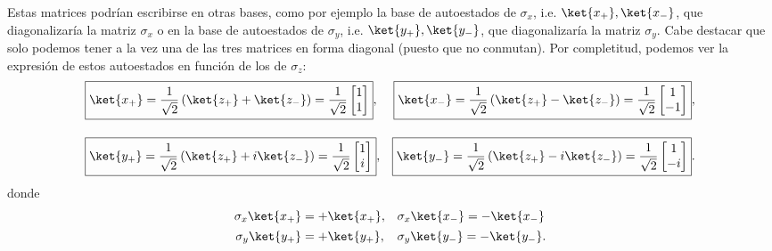 \documentclass[a4paper,11pt]{book} %
\numberwithin{equation}{chapter}
\def\lp{\left(}
\def\rp{\right)}
\begin{document}
Estas matrices podrían escribirse en otras bases, como por ejemplo la base de autoestados de $\sigma_x$, i.e. $\ket{x_+}, \ket{x_-}$, que diagonalizaría la matriz $\sigma_x$ o en la base de autoestados de $\sigma_y$, i.e. $\ket{y_+}, \ket{y_-}$, que diagonalizaría la matriz $\sigma_y$. Cabe destacar que solo podemos tener a la vez una de las tres matrices en forma diagonal (puesto que no conmutan). Por completitud, podemos ver la expresión de estos autoestados en función de los de $ \sigma_z$:
\begin{align}
& \boxed{\ket{x_+}  = \frac{1}{\sqrt{2}} \lp \ket{z_+} + \ket{z_-} \rp = \frac{1}{\sqrt{2}} \begin{bmatrix}  1 \\ 1  \end{bmatrix}},
& \boxed{\ket{x_-}  = \frac{1}{\sqrt{2}} \lp \ket{z_+} - \ket{z_-} \rp = \frac{1}{\sqrt{2}} \begin{bmatrix}  1 \\ -1  \end{bmatrix}},   \\ \rule{0mm}{10mm}
& \boxed{\ket{y_+}  = \frac{1}{\sqrt{2}} \lp \ket{z_+} + i \ket{z_-} \rp = \frac{1}{\sqrt{2}} \begin{bmatrix}  1 \\ i  \end{bmatrix}}, 
& \boxed{\ket{y_-}   = \frac{1}{\sqrt{2}} \lp \ket{z_+} - i \ket{z_-} \rp = \frac{1}{\sqrt{2}} \begin{bmatrix}  1 \\ -i \end{bmatrix}}.
\end{align}
donde
\begin{align}
 \sigma_x \ket{x_+} & = + \ket{x_+},
 &&\sigma_x \ket{x_-}  =  - \ket{x_-}  \\ \rule{0mm}{3mm}
 \sigma_y \ket{y_+} & = + \ket{y_+},
 &&\sigma_y \ket{y_-}   = - \ket{y_-}.
\end{align}
\end{document}
